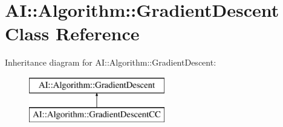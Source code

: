\hypertarget{classAI_1_1Algorithm_1_1GradientDescent}{\section{A\-I\-:\-:Algorithm\-:\-:Gradient\-Descent Class Reference}
\label{classAI_1_1Algorithm_1_1GradientDescent}
}
Inheritance diagram for A\-I\-:\-:Algorithm\-:\-:Gradient\-Descent\-:\begin{figure}[H]
\begin{center}
\leavevmode
\includegraphics[height=2.000000cm]{classAI_1_1Algorithm_1_1GradientDescent}
\end{center}
\end{figure}
